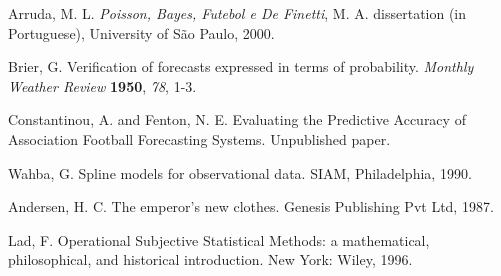 \documentclass[journal,article,accept,moreauthors,pdftex,12pt,a4paper]{mdpi}
\begin{document}













\makeatletter
\renewcommand\@biblabel[1]{#1. }
\makeatother

\begin{thebibliography}{999} %




Arruda, M. L. {\em Poisson, Bayes, Futebol e De Finetti}, M. A. dissertation (in Portuguese), University of S\~ao Paulo, 2000.

Brier, G. Verification of forecasts expressed in terms of probability. {\em Monthly Weather Review} {\bf 1950}, {\em 78}, 1-3.

Constantinou, A. and Fenton, N. E. Evaluating the Predictive Accuracy of Association Football Forecasting Systems. Unpublished paper.

Wahba, G. Spline models for observational data.
SIAM, Philadelphia, 1990.

Andersen, H.  C. The emperor's new clothes. Genesis Publishing Pvt Ltd, 1987.

Lad, F. Operational Subjective Statistical Methods: a mathematical, philosophical, and historical introduction. New York: Wiley, 1996.

\end{thebibliography}
\end{document}
